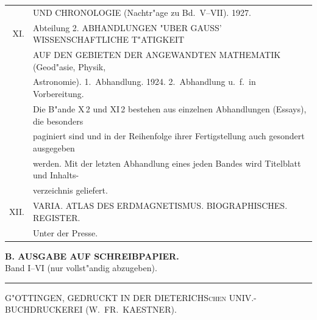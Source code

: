 \documentclass[12pt,a4paper]{article}
\theoremstyle{plain}
\theoremstyle{definition}
\theoremstyle{remark}
\begin{document}
\begin{tabular}{@{}rp{11cm}@{}}
& \textsc{UND CHRONOLOGIE} (Nachtr"age zu Bd.\ V--VII). 1927.\\[0.3em]
\textsc{XI.} & Abteilung 2. \textsc{ABHANDLUNGEN "UBER GAUSS' WISSENSCHAFTLICHE T"ATIGKEIT}\\
& \textsc{AUF DEN GEBIETEN DER ANGEWANDTEN MATHEMATIK} (Geod"asie, Physik,\\
& Astronomie). 1.\ Abhandlung. 1924. 2.\ Abhandlung u.\ f.\ in Vorbereitung.\\
& Die B"ande X\,2 und XI\,2 bestehen aus einzelnen Abhandlungen (Essays), die besonders\\
& paginiert sind und in der Reihenfolge ihrer Fertigstellung auch gesondert ausgegeben\\
& werden. Mit der letzten Abhandlung eines jeden Bandes wird Titelblatt und Inhalts-\\
& verzeichnis geliefert.\\[0.3em]
\textsc{XII.} & \textsc{VARIA. ATLAS DES ERDMAGNETISMUS. BIOGRAPHISCHES. REGISTER.}\\
& Unter der Presse.
\end{tabular}

\vspace{1em}
\begin{center}\textbf{B. AUSGABE AUF SCHREIBPAPIER.}\\
Band I--VI (nur vollst"andig abzugeben).
\end{center}

\vspace{1em}
\hrule
\vspace{0.5em}
\begin{center}
\textsc{G"OTTINGEN, GEDRUCKT IN DER DIETERICHSchen UNIV.-BUCHDRUCKEREI (W.\ FR.\ KAESTNER).}
\end{center}
\end{document}
